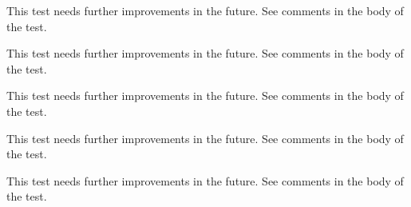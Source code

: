 \begin{DoxyRefList}
%
 This test needs further improvements in the future. See comments in the body of the test.  
\item[Subprogram \mbox{\hyperlink{namespaceTest__System__mod_aabfd080659733c4a852c62ccd400599b}{Test\+\_\+\+System\+\_\+mod\+::test\+\_\+\+OS\+\_\+type\+\_\+1}} ()]\label{todo__todo000086}%
%
 This test needs further improvements in the future. See comments in the body of the test.  
\item[Subprogram \mbox{\hyperlink{namespaceTest__System__mod_a86976d55b3a779d9a8c0064155e9cd4a}{Test\+\_\+\+System\+\_\+mod\+::test\+\_\+\+OS\+\_\+type\+\_\+2}} ()]\label{todo__todo000087}%
%
 This test needs further improvements in the future. See comments in the body of the test.  
\item[Subprogram \mbox{\hyperlink{namespaceTest__System__mod_ada729e6f3789a1df730ac21f58d5a334}{Test\+\_\+\+System\+\_\+mod\+::test\+\_\+\+OS\+\_\+type\+\_\+3}} ()]\label{todo__todo000088}%
%
 This test needs further improvements in the future. See comments in the body of the test.  
\item[Subprogram \mbox{\hyperlink{namespaceTest__System__mod_a6ba8a4348e2457b775dd061d40f33cb8}{Test\+\_\+\+System\+\_\+mod\+::test\+\_\+\+Sys\+Cmd\+\_\+type\+\_\+1}} ()]\label{todo__todo000089}%
%
 This test needs further improvements in the future. See comments in the body of the test. 
\end{DoxyRefList}